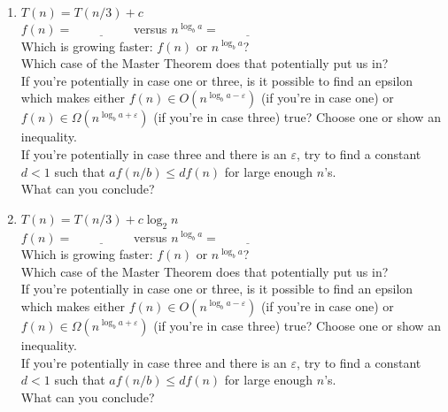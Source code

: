 \documentclass[12 pt]{amsart}
\renewcommand{\epsilon}{\varepsilon}
\begin{document}
\begin{enumerate}[label=\arabic*.)]

	\item $T(n) = T(n/3) + c$ \\
	$f(n) = \underline{\phantom{xxxxxxxx}}$ versus $n^{\log_b a} = \underline{\phantom{xxxxxxxx}}$ \\
	Which is growing faster: $f(n)$ or  $n^{\log_b a}$?  \underline{\phantom{xxxxxxxxxxx}} \\
	Which case of the Master Theorem does that potentially put us in?  \underline{\phantom{xxxx}} \\
	If you're potentially in case one or three, is it possible to find an epsilon which makes either $f(n) \in O(n^{\log_b a - \epsilon})$ (if you're in case one) or $f(n) \in \Omega(n^{\log_b a+ \epsilon})$ (if you're in case three) true? Choose one or show an inequality. \underline{\phantom{xxxxx}} \\
	If you're potentially in case three and there is an $\epsilon$, try to find a constant $d<1$ such that $a f(n/b) \leq d f(n)$ for large enough $n$'s.
	\underline{\phantom{xxxxxxxxxxxxxxx}}\\
	What can you conclude? \underline{\phantom{xxxxxxxxxxxxxxx}}
	
	\bigskip
	
	\item $T(n) = T(n/3) + c\log_2 n$ \\
	$f(n) = \underline{\phantom{xxxxxxxx}}$ versus $n^{\log_b a} = \underline{\phantom{xxxxxxxx}}$ \\
	Which is growing faster: $f(n)$ or  $n^{\log_b a}$?  \underline{\phantom{xxxxxxxxxxx}} \\
	Which case of the Master Theorem does that potentially put us in?  \underline{\phantom{xxxx}} \\
	If you're potentially in case one or three, is it possible to find an epsilon which makes either $f(n) \in O(n^{\log_b a - \epsilon})$ (if you're in case one) or $f(n) \in \Omega(n^{\log_b a+ \epsilon})$ (if you're in case three) true? Choose one or show an inequality. \underline{\phantom{xxxxx}} \\
	If you're potentially in case three and there is an $\epsilon$, try to find a constant $d<1$ such that $a f(n/b) \leq d f(n)$ for large enough $n$'s.
	\underline{\phantom{xxxxxxxxxxxxxxx}}\\
	What can you conclude? \underline{\phantom{xxxxxxxxxxxxxxx}}
	

\end{enumerate}
\end{document}
